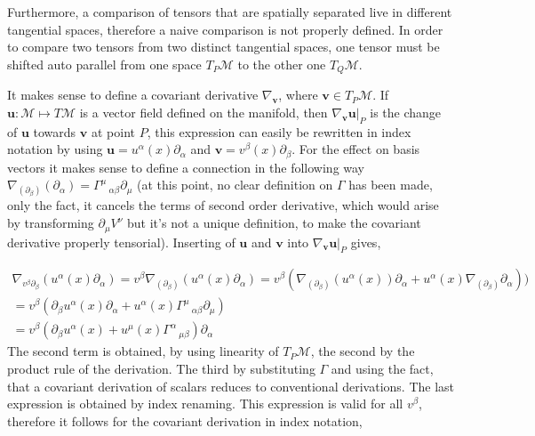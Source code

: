 \documentclass[12pt,a4paper]{article}
\begin{document}
	
	Furthermore, a comparison of tensors that are spatially separated live in different tangential spaces, therefore a naive comparison is not properly defined. In order to compare two tensors from two distinct tangential spaces, one tensor must be shifted auto parallel from one space $T_P\mathcal{M}$ to the other one $T_Q\mathcal{M}$.
	
	
	It makes sense to define a covariant derivative $\nabla_\textbf{v}$, where $\textbf{v} \in T_P\mathcal{M}$. If $\textbf{u} : \mathcal{M} \mapsto T\mathcal{M}$ is a vector field defined on the manifold, then $\nabla_\textbf{v}\textbf{u} |_P$ is the change of $\textbf{u}$ towards $\textbf{v}$ at point $P$, this expression can easily be rewritten in index notation by using
	$\textbf{u} = u^\alpha(x) \partial_\alpha$ and $\textbf{v} = v^\beta(x) \partial_\beta$. For the effect on basis vectors it makes sense to define a connection in the following way $\nabla_{(\partial_\beta)}(\partial_\alpha) = \Gamma^\mu\,_{\alpha \beta} \partial_\mu$ (at this point, no clear definition on $\Gamma$ has been made, only the fact, it cancels the terms of second order derivative, which would arise by transforming $\partial_\mu V^\nu$ but it's not a unique definition, to make the covariant derivative properly tensorial). Inserting of $\textbf{u}$ and $\textbf{v} $ into $\nabla_\textbf{v}\textbf{u} |_P$ gives,
	
	\begin{multline}
		\label{kovariant}
		\nabla_{v^\beta \partial_\beta}(u^\alpha(x) \partial_\alpha) = v^\beta \nabla_{(\partial_\beta)} (u^\alpha(x)\partial_\alpha ) = v^\beta \left(\nabla_{(\partial_\beta)} (u^\alpha(x)) \partial_\alpha +  u^\alpha(x) \nabla_{(\partial_\beta)} \partial_\alpha \right)) \\ = v^\beta \left(\partial_\beta u^\alpha(x)  \partial_\alpha +  u^\alpha(x) \Gamma^\mu\,_{\alpha \beta} \partial_\mu\right)  \\ = v^\beta \left(\partial_\beta u^\alpha(x)   +  u^\mu(x) \Gamma^\alpha\,_{\mu \beta}\right) \partial_\alpha 
	\end{multline}
	The second term is obtained, by using linearity of $T_P\mathcal{M}$, the second by the product rule of the derivation. The third by substituting $\Gamma$ and using the fact, that a covariant derivation of scalars reduces to conventional derivations. The last expression is obtained by index renaming. This expression is valid for all $v^\beta$, therefore it follows for the covariant derivation in index notation,
	
\end{document}
